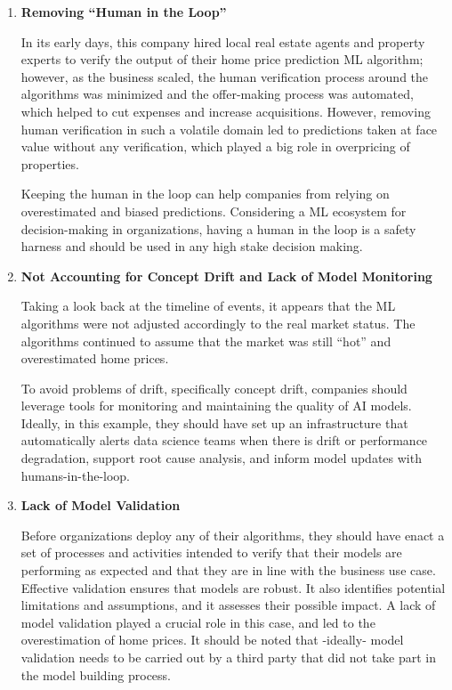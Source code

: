 \documentclass{article}
\begin{document}
\begin{enumerate}
\item \textbf{Removing ``Human in the Loop''}

\smallskip In its early days, this company hired local real estate agents and property experts to verify the output of their home price prediction ML algorithm; however, as the business scaled, the human verification process around the algorithms was minimized\cite{bloomberg} and the offer-making process was automated, which helped to cut expenses and increase acquisitions.
However, removing human verification in such a volatile domain led to predictions taken at face value without any verification, which played a big role in overpricing of properties.

\smallskip Keeping the human in the loop can help companies from relying on overestimated and biased predictions.
Considering a ML ecosystem for decision-making in organizations, having a human in the loop is a safety harness and should be used in any high stake decision making.

\item \textbf{Not Accounting for Concept Drift and Lack of Model Monitoring}

\smallskip Taking a look back at the timeline of events, it appears that the ML algorithms were not adjusted accordingly to the real market status\cite{bloomberg}. The algorithms continued to assume that the market was still ``hot'' and overestimated home prices.

\smallskip To avoid problems of drift, specifically concept drift, companies should leverage tools for monitoring and maintaining the quality of AI models. Ideally, in this example, they should have set up an infrastructure that automatically alerts data science teams when there is drift or performance degradation, support root cause analysis, and inform model updates with humans-in-the-loop.

\item \textbf{Lack of Model Validation}

\smallskip Before organizations deploy any of their algorithms, they should have enact a set of processes and activities intended to verify that their models are performing as expected and that they are in line with the business use case. Effective validation ensures that models are robust. It also identifies potential limitations and assumptions, and it assesses their possible impact. 
A lack of model validation played a crucial role in this case, and led to the overestimation of home prices. It should be noted that -ideally- model validation needs to be carried out by a third party that did not take part in the model building process.


\end{enumerate}
\end{document}
